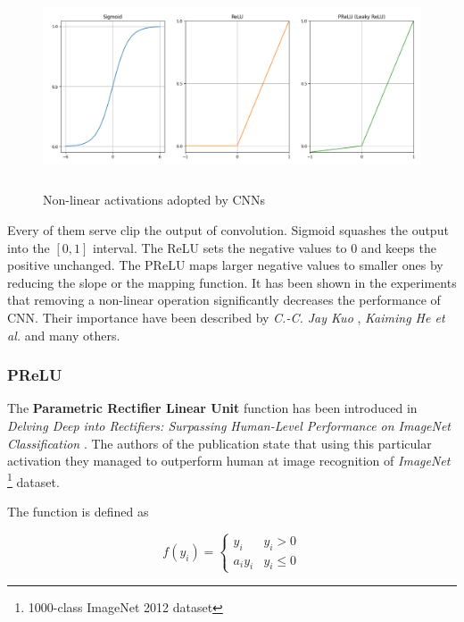\begin{figure}[h]
    \centering
    \includegraphics[width=16cm, height=6cm]{img/CNN-activations.png}
    \caption{Non-linear activations adopted by CNNs}
    \label{fig:conv-activation}
\end{figure}

Every of them serve clip the output of convolution. Sigmoid squashes the output into the $[0, 1]$ interval. The ReLU sets the negative values to 0 and keeps the positive unchanged. The PReLU maps larger negative values to smaller ones by reducing the slope or the mapping function. It has been shown in the experiments that removing a non-linear operation significantly decreases the performance of CNN. Their importance have been described by \emph{C.-C. Jay Kuo} \cite{kuo2016understanding}, \emph{Kaiming He et al.} \cite{he2015delving} and many others.


\subsubsection*{PReLU}
\label{sub2:prelu}

The \textbf{Parametric Rectifier Linear Unit} function has been introduced in \emph{Delving Deep into Rectifiers: Surpassing Human-Level Performance on ImageNet Classification} \cite{he2015delving}. The authors of the publication state that using this particular activation they managed to outperform human at image recognition of \emph{ImageNet} \footnote{1000-class ImageNet 2012 dataset} dataset.

The function is defined as

\begin{equation}
    f(y_i) = 
        \begin{cases}
        y_i & y_i > 0 \\
        a_i y_i & y_i \leq 0
        \end{cases}
\end{equation}


